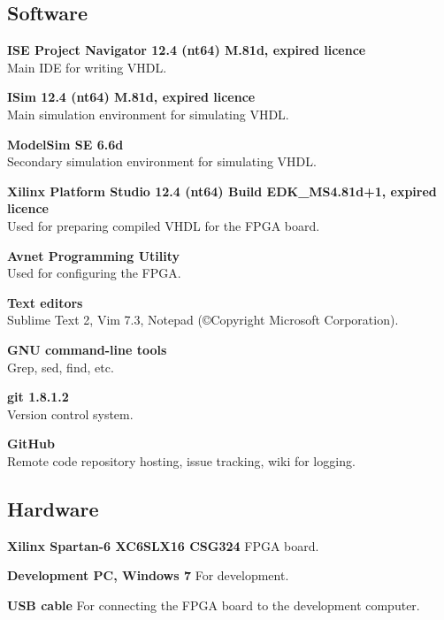 \subsection{Software}
\begin{description}
    \item{\textbf{ISE Project Navigator 12.4 (nt64) M.81d, expired licence}} \\
        Main IDE for writing VHDL.
    \item{\textbf{ISim 12.4 (nt64) M.81d, expired licence}} \\
        Main simulation environment for simulating VHDL.
    \item{\textbf{ModelSim SE 6.6d}} \\
        Secondary simulation environment for simulating VHDL.
    \item{\textbf{Xilinx Platform Studio 12.4 (nt64) Build EDK\_MS4.81d+1, expired licence}} \\
        Used for preparing compiled VHDL for the FPGA board.
    \item{\textbf{Avnet Programming Utility}} \\
        Used for configuring the FPGA.
    \item{\textbf{Text editors}} \\
        Sublime Text 2, Vim 7.3, Notepad (©Copyright Microsoft Corporation).
    \item{\textbf{GNU command-line tools}} \\
        Grep, sed, find, etc.
    \item{\textbf{git 1.8.1.2}} \\
        Version control system.
    \item{\textbf{GitHub}} \\
        Remote code repository hosting, issue tracking, wiki for logging.
\end{description}

\subsection{Hardware}
\begin{description}
\item{\textbf{Xilinx Spartan-6 XC6SLX16 CSG324}}
    FPGA board.
\item{\textbf{Development PC, Windows 7}}
    For development.
\item{\textbf{USB cable}}
    For connecting the FPGA board to the development computer.
\end{description}


